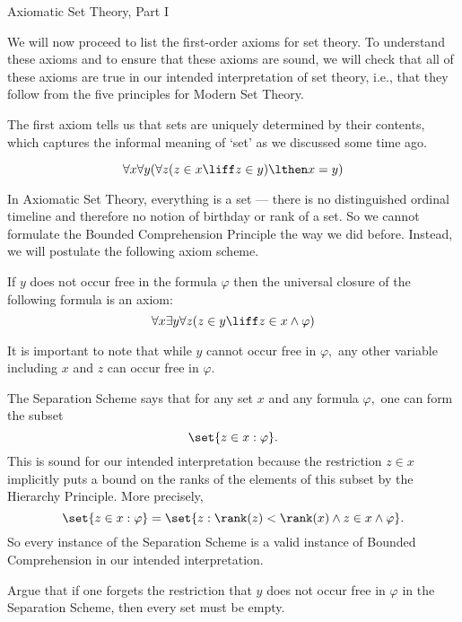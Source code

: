 \begin{unit}{Axiomatic Set Theory, Part I}

We will now proceed to list the first-order axioms for set theory.
To understand these axioms and to ensure that these axioms are sound, we will check that all of these axioms are true in our intended interpretation of set theory, i.e., that they follow from the five principles for Modern Set Theory.

The first axiom tells us that sets are uniquely determined by their contents, which captures the informal meaning of `set' as we discussed some time ago. 

\begin{axiom}[Extensionality]
  \[\forall x \forall y(\forall z (z \in x \liff z \in y) \lthen x = y)\]
\end{axiom}

In Axiomatic Set Theory, everything is a set --- there is no distinguished ordinal timeline and therefore no notion of birthday or rank of a set.
So we cannot formulate the Bounded Comprehension Principle the way we did before.
Instead, we will postulate the following axiom scheme.

\begin{axiom}
  If \(y\) does not occur free in the formula \(\varphi\) then the universal closure of the following formula is an axiom:
  \[\forall x \exists y \forall z (z \in y \liff z \in x \land \varphi)\]
\end{axiom}

\noindent
It is important to note that while \(y\) cannot occur free in \(\varphi,\) any other variable including \(x\) and \(z\) can occur free in \(\varphi.\)

The Separation Scheme says that for any set \(x\) and any formula \(\varphi,\) one can form the subset \[\set{z \in x : \varphi}.\]
This is sound for our intended interpretation because the restriction \(z \in x\) implicitly puts a bound on the ranks of the elements of this subset by the Hierarchy Principle.
More precisely, \[\set{z \in x : \varphi} = \set{z : \rank(z) < \rank(x) \land z \in x \land \varphi}.\] 
So every instance of the Separation Scheme is a valid instance of Bounded Comprehension in our intended interpretation.

\begin{problem}
  Argue that if one forgets the restriction that \(y\) does not occur free in \(\varphi\) in the Separation Scheme, then every set must be empty.
\end{problem}


\end{unit}
